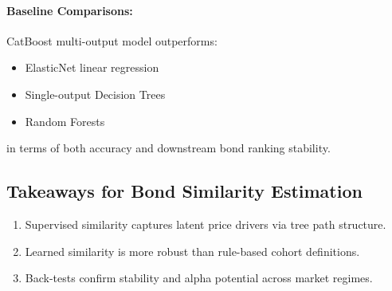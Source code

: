 \documentclass{article}
\begin{document}
\paragraph{Baseline Comparisons:}
CatBoost multi-output model outperforms:
\begin{itemize}[nosep]
    \item ElasticNet linear regression
    \item Single-output Decision Trees
    \item Random Forests
\end{itemize}
in terms of both accuracy and downstream bond ranking stability.

\subsection*{Takeaways for Bond Similarity Estimation}
\begin{enumerate}[nosep]
    \item Supervised similarity captures latent price drivers via tree path structure.
    \item Learned similarity is more robust than rule-based cohort definitions.
    \item Back-tests confirm stability and alpha potential across market regimes.
\end{enumerate}
\end{document}
